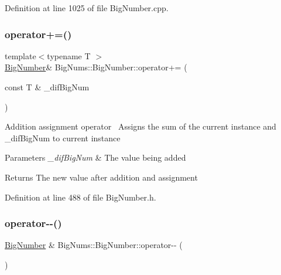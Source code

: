 Definition at line 1025 of file Big\+Number.\+cpp.

\mbox{\label{class_big_nums_1_1_big_number_a99a14e0f44f08f04dd686a8fb1251338}} 
\subsubsection{\texorpdfstring{operator+=()}{operator+=()}}
{\footnotesize\ttfamily template$<$typename T $>$ \\
\mbox{\hyperlink{class_big_nums_1_1_big_number}{Big\+Number}}\& Big\+Nums\+::\+Big\+Number\+::operator+= (\begin{DoxyParamCaption}\item[{const T \&}]{\+\_\+dif\+Big\+Num }\end{DoxyParamCaption})\hspace{0.3cm}{\ttfamily [inline]}}

Addition assignment operator~\newline
Assigns the sum of the current instance and \+\_\+dif\+Big\+Num to current instance 
\begin{DoxyParams}{Parameters}
{\em \+\_\+dif\+Big\+Num} & The value being added \\
\hline
\end{DoxyParams}
\begin{DoxyReturn}{Returns}
The new value after addition and assignment 
\end{DoxyReturn}


Definition at line 488 of file Big\+Number.\+h.

\mbox{\label{class_big_nums_1_1_big_number_ada3ed05861f520f73182e42c9fb153cb}} 
\subsubsection{\texorpdfstring{operator-\/-\/()}{operator--()}\hspace{0.1cm}{\footnotesize\ttfamily [1/2]}}
{\footnotesize\ttfamily \mbox{\hyperlink{class_big_nums_1_1_big_number}{Big\+Number}} \& Big\+Nums\+::\+Big\+Number\+::operator-\/-\/ (\begin{DoxyParamCaption}{ }\end{DoxyParamCaption})}

